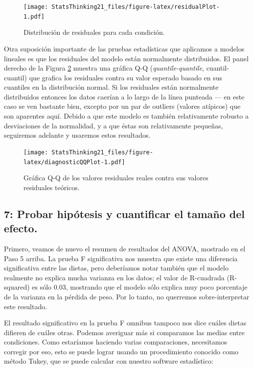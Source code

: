 \documentclass[
  12pt,
]{book}
\begin{document}
\begin{figure}
\centering
\texttt{[image: StatsThinking21\_files/figure-latex/residualPlot-1.pdf]}
\caption{\label{fig:residualPlot}Distribución de residuales para cada condición.}
\end{figure}

Otra suposición importante de las pruebas estadísticas que aplicamos a modelos lineales es que los residuales del modelo están normalmente distribuidos. El panel derecho de la Figura \ref{fig:diagnosticQQPlot} muestra una gráfica Q-Q (\emph{quantile-quantile}, cuantil-cuantil) que grafica los residuales contra su valor esperado basado en sus cuantiles en la distribución normal. Si los residuales están normalmente distribuidos entonces los datos caerían a lo largo de la línea punteada --- en este caso se ven bastante bien, excepto por un par de outliers (valores atípicos) que son aparentes aquí. Debido a que este modelo es también relativamente robusto a desviaciones de la normalidad, y a que éstas son relativamente pequeñas, seguiremos adelante y usaremos estos resultados.

\begin{figure}
\centering
\texttt{[image: StatsThinking21\_files/figure-latex/diagnosticQQPlot-1.pdf]}
\caption{\label{fig:diagnosticQQPlot}Gráfica Q-Q de los valores residuales reales contra sus valores residuales teóricos.}
\end{figure}

\hypertarget{probar-hipuxf3tesis-y-cuantificar-el-tamauxf1o-del-efecto.}{%
\subsection{7: Probar hipótesis y cuantificar el tamaño del efecto.}\label{probar-hipuxf3tesis-y-cuantificar-el-tamauxf1o-del-efecto.}}

Primero, veamos de nuevo el resumen de resultados del ANOVA, mostrado en el Paso 5 arriba. La prueba F significativa nos muestra que existe una diferencia significativa entre las dietas, pero deberíamos notar también que el modelo realmente no explica mucha varianza en los datos; el valor de R-cuadrada (R-squared) es sólo 0.03, mostrando que el modelo sólo explica muy poco porcentaje de la varianza en la pérdida de peso. Por lo tanto, no querremos sobre-interpretar este resultado.

El resultado significativo en la prueba F omnibus tampoco nos dice cuáles dietas difieren de cuáles otras. Podemos averiguar más si comparamos las medias entre condiciones. Como estaríamos haciendo varias comparaciones, necesitamos corregir por eso, esto se puede lograr usando un procedimiento conocido como método Tukey, que se puede calcular con nuestro software estadístico:
\end{document}
